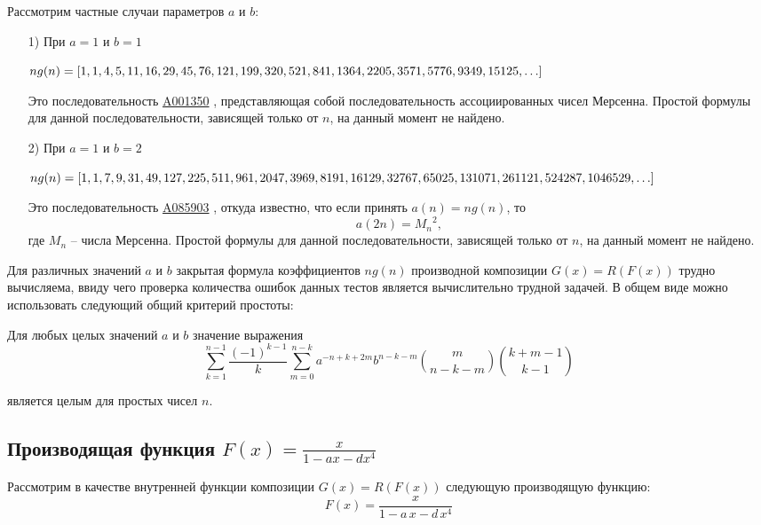 \documentclass[
russian,
cp1251,
14pt,
simple
]{eskdtext}
\theoremstyle{definition}
\begin{document}
Рассмотрим частные случаи параметров $a$ и $b$:
\begin{itemize}

\item[1)] При $a=1$ и $b=1$

\begin{math}
ng(n)=[1,1,4,5,11,16,29,45,76,121,199,320,521,841,1364,2205,\\
3571,5776,9349,15125,\ldots]
\end{math}

Это последовательность \href{http://oeis.org/A001350}{A001350} \cite{oeis}, представляющая собой последовательность ассоциированных чисел Мерсенна. Простой формулы для данной последовательности, зависящей только от $n$, на данный момент не найдено.

\item[2)] При $a=1$ и $b=2$

\begin{math}
ng(n)=[1,1,7,9,31,49,127,225,511,961,2047,3969,8191,16129,\\
32767,65025,131071,261121,524287,1046529,\ldots]
\end{math}

Это последовательность \href{http://oeis.org/A085903}{A085903} \cite{oeis}, откуда известно, что если принять $a(n)=ng(n)$, то
$$
a(2n) = {\mathit{M_n}}^2,
$$
где $\mathit{M_n}$ -- числа Мерсенна. Простой формулы для данной последовательности, зависящей только от $n$, на данный момент не найдено.
\end{itemize}

Для различных значений $a$ и $b$ закрытая формула коэффициентов $ng(n)$ производной композиции $G(x)=R(F(x))$ трудно вычисляема, ввиду чего проверка количества ошибок данных тестов является вычислительно трудной задачей. В общем виде можно использовать следующий общий критерий простоты:

Для любых целых значений $a$ и $b$ значение выражения
$$
\sum\limits _{k=1}^{n-1}\frac{(-1)^{k-1}}{k}  \sum\limits _{m=0}^{n-k} a^{-n + k + 2m}b^{n - k - m}{m \choose n-k-m}{k+m-1 \choose k-1}
$$

является целым для простых чисел $n$.

\subsection{Производящая функция $F(x)=\frac{x}{1 - a x - d x^4}$}
Рассмотрим в качестве внутренней функции композиции $G(x)=R(F(x))$ следующую производящую функцию:
$$
F(x)=\frac{x}{1-a\,x-d\,x^4}
$$
\end{document}
